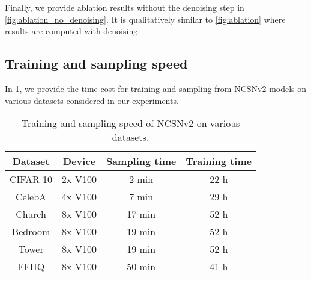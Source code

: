 \documentclass{article}
\begin{document}
Finally, we provide ablation results without the denoising step in \cref{fig:ablation_no_denoising}. It is qualitatively similar to \cref{fig:ablation} where results are computed with denoising.




\subsection{Training and sampling speed}
In \cref{tab:speed}, we provide the time cost for training and sampling from NCSNv2 models on various datasets considered in our experiments.
\begin{table}[H]
    \caption{Training and sampling speed of NCSNv2 on various datasets.}\label{tab:speed}
    \begin{center}
	\begin{tabular}{cccc}
		\toprule
		Dataset & Device & Sampling time & Training time\\
		\midrule
		CIFAR-10 &	2x V100	& 2 min	& 22 h\\
		CelebA	& 4x V100 & 7 min & 29 h\\
		Church & 8x V100 & 17 min & 52 h\\
		Bedroom & 8x V100 & 19 min & 52 h\\
		Tower & 8x V100 & 19 min & 52 h\\
		FFHQ & 8x V100 & 50 min & 41 h\\
		\bottomrule
	\end{tabular}
	\end{center}
\end{table}
\end{document}
